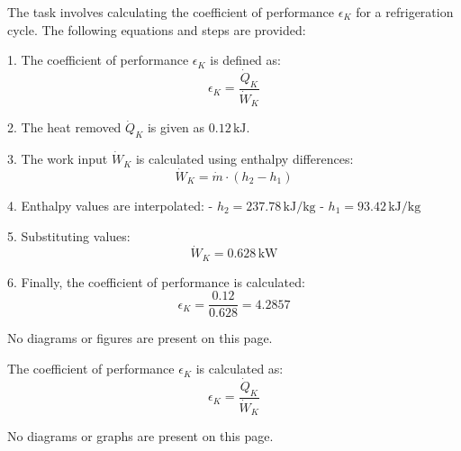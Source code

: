 The task involves calculating the coefficient of performance \( \epsilon_K \) for a refrigeration cycle. The following equations and steps are provided:

1. The coefficient of performance \( \epsilon_K \) is defined as:  
   \[
   \epsilon_K = \frac{\dot{Q}_K}{\dot{W}_K}
   \]

2. The heat removed \( \dot{Q}_K \) is given as \( 0.12 \, \text{kJ} \).

3. The work input \( \dot{W}_K \) is calculated using enthalpy differences:  
   \[
   \dot{W}_K = \dot{m} \cdot (h_2 - h_1)
   \]

4. Enthalpy values are interpolated:  
   - \( h_2 = 237.78 \, \text{kJ/kg} \)  
   - \( h_1 = 93.42 \, \text{kJ/kg} \)

5. Substituting values:  
   \[
   \dot{W}_K = 0.628 \, \text{kW}
   \]

6. Finally, the coefficient of performance is calculated:  
   \[
   \epsilon_K = \frac{0.12}{0.628} = 4.2857
   \]

No diagrams or figures are present on this page.

The coefficient of performance \( \epsilon_K \) is calculated as:  
\[
\epsilon_K = \frac{\dot{Q}_K}{\dot{W}_K}
\]  

No diagrams or graphs are present on this page.